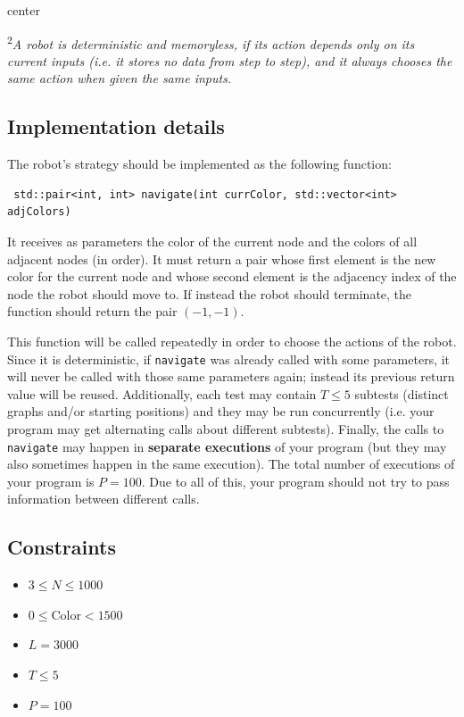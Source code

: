 \documentclass[12pt]{article}
\begin{document}
\begin{adjustbox}{center}
	
\end{adjustbox}

\textsuperscript{2}\textit{A robot is deterministic and memoryless, if its action depends only on its current inputs (i.e. it stores no data from step to step), and it always chooses the same action when given the same inputs.}

\subsection{Implementation details}
The robot's strategy should be implemented as the following function:
\begin{lstlisting}
 std::pair<int, int> navigate(int currColor, std::vector<int> adjColors)
\end{lstlisting}

It receives as parameters the color of the current node and the colors of all adjacent nodes (in order). It must return a pair whose first element is the new color for the current node and whose second element is the adjacency index of the node the robot should move to. If instead the robot should terminate, the function should return the pair $(-1, -1)$.

This function will be called repeatedly in order to choose the actions of the robot. Since it is deterministic, if \texttt{navigate} was already called with some parameters, it will never be called with those same parameters again; instead its previous return value will be reused. Additionally, each test may contain $T \leq 5$ subtests (distinct graphs and/or starting positions) and they may be run concurrently (i.e. your program may get alternating calls about different subtests). Finally, the calls to \texttt{navigate} may happen in \textbf{separate executions} of your program (but they may also sometimes happen in the same execution). The total number of executions of your program is $P = 100$. Due to all of this, your program should not try to pass information between different calls.

\subsection{Constraints}

\begin{itemize}
\item $3 \leq N \leq 1000$
\item $0 \leq \mathrm{Color} < 1500$
\item $L = 3000$
\item $T \leq 5$
\item $P = 100$
\end{itemize}
\end{document}
